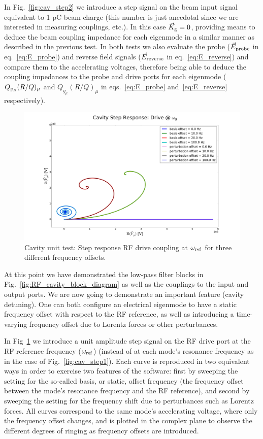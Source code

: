 \documentclass[a4paper,12pt]{article}
\begin{document}
In Fig.~\ref{fig:cav_step2} we introduce a step signal on the beam input signal equivalent to 1 pC beam charge (this number is just anecdotal since we are interested in measuring couplings, etc.). In this case $\vec K_{\rm g}=0$, providing means to deduce the beam coupling impedance for each eigenmode in a similar manner as described in the previous test. In both tests we also evaluate the probe ($\vec E_{\rm probe}$ in eq.~\ref{eq:E_probe}) and reverse field signals ($\vec E_{\rm reverse}$ in eq.~\ref{eq:E_reverse}) and compare them to the accelerating voltages, therefore being able to deduce the coupling impedances to the probe and drive ports for each eigenmode ($Q_{\rm p_{\mu}}(R/Q)_{\mu}$ and $Q_{g_{\mu}}(R/Q)_\mu$ in eqs.~\ref{eq:E_probe} and~\ref{eq:E_reverse} respectively).

\begin{figure}
\centering
\includegraphics[scale=0.27]{../figures/cavity_test_freqs.png}
\caption{Cavity unit test: Step response RF drive coupling at $\omega_{\rm ref}$ for three different frequency offsets.}
\label{fig:cav_step3}
\end{figure}

At this point we have demonstrated the low-pass filter blocks in Fig.~\ref{fig:RF_cavity_block_diagram} as well as the couplings to the input and output ports. We are now going to demonstrate an important feature (cavity detuning). One can both configure an electrical eigenmode to have a static frequency offset with respect to the RF reference, as well as introducing a time-varying frequency offset due to Lorentz forces or other perturbances.

In Fig~\ref{fig:cav_step3} we introduce a unit amplitude step signal on the RF drive port at the RF reference frequency ($\omega_{\rm ref}$) (instead of at each mode's resonance frequency as in the case of Fig.~\ref{fig:cav_step1}). Each curve is reproduced in two equivalent ways in order to exercise two features of the software: first by sweeping the setting for the so-called basis, or static, offset frequency (the frequency offset between the mode's resonance frequency and the RF reference), and second by sweeping the setting for the frequency shift due to perturbances such as Lorentz forces. All curves correspond to the same mode's accelerating voltage, where only the frequency offset changes, and is plotted in the complex plane to observe the different degrees of ringing as frequency offsets are introduced.
\end{document}

